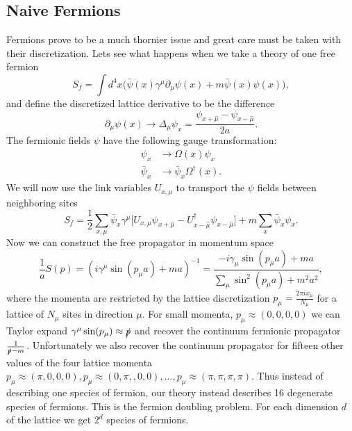 \subsection{Naive Fermions}
Fermions prove to be a much thornier issue and great care must be taken with their discretization.
Lets see what happens when we take a theory of one free fermion
\begin{equation}
  S_f=\int d^4x\Big(\bar{\psi}(x)\gamma^\mu\partial_\mu\psi(x)+m\bar{\psi}(x)\psi(x)\Big),
\end{equation}
and define the discretized lattice derivative to be the difference 
\begin{equation}
  \partial_\mu\psi(x)\rightarrow\Delta_\mu\psi_x=\frac{\psi_{x+\hat{\mu}}-\psi_{x-\hat{\mu}}}{2a}.
\end{equation}
The fermionic fields $\psi$ have the following gauge transformation:
\begin{equation}
  \begin{aligned}
    \psi_x&\rightarrow\Omega(x)\psi_x \\
    \bar{\psi}_x&\rightarrow\bar{\psi}_x\Omega^\dagger(x).
  \end{aligned}
\end{equation}
We will now use the link variables $U_{x,\mu}$ to transport the $\psi$ fields between neighboring sites
\begin{equation}
  S_f=\frac{1}{2}\sum_{x,\mu} \bar{\psi}_x\gamma^\mu\big[U_{x,\mu}\psi_{x+\hat{\mu}}-U^\dagger_{x-\hat{\mu}}\psi_{x-\hat{\mu}}\big]+m\sum_x \bar{\psi}_x\psi_x.
\end{equation}
Now we can construct the free propagator in momentum space
\begin{equation}
  \frac{1}{a}S(p)=(i\gamma^\mu\sin(p_\mu a) + ma)^{-1}=\frac{-i\gamma_\mu\sin(p_\mu a)+ma}{\sum_\mu \sin^2(p_\mu a)+m^2a^2},
\end{equation}
where the momenta are restricted by the lattice discretization $p_\mu=\frac{2\pi ix_\mu}{N_\mu}$ for a lattice of $N_\mu$ sites in direction $\mu$.
For small momenta, $p_\mu \approx (0,0,0,0)$ we can Taylor expand $\gamma^\mu\sin(p_\mu)\approx \slashed{p}$ and recover the continuum fermionic propagator $\frac{1}{\slashed{p}-m}$.
Unfortunately we also recover the continuum propagator for fifteen other values of the four lattice momenta $p_\mu\approx(\pi,0,0,0),p_\mu\approx(0,\pi,,0,0),...,p_\mu\approx(\pi,\pi,\pi,\pi)$.
Thus instead of describing one species of fermion, our theory instead describes 16 degenerate species of fermions.
This is the fermion doubling problem.
For each dimension $d$ of the lattice we get $2^d$ species of fermions.

